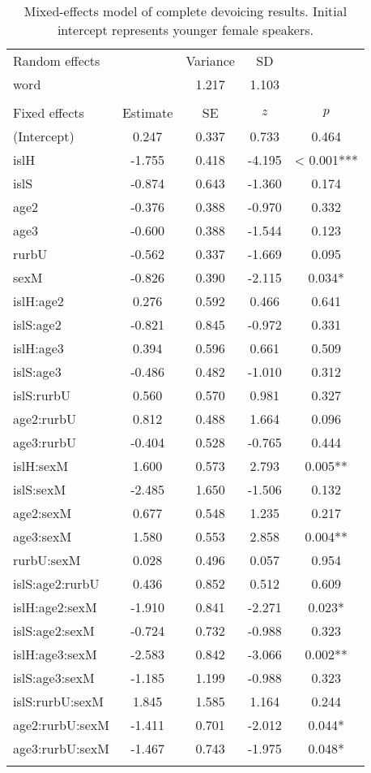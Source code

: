 \documentclass[output=paper,colorlinks,citecolor=brown]{langscibook}
\begin{document}
\begin{table}[hp]
\begin{tabular}{l S[table-format=-1.3] S[table-format=1.3] S[table-format=-1.3] S[table-format=<1.3{***}]}
\lsptoprule
{Random effects} &  & {Variance} & {SD} & \\
word &  & 1.217 & 1.103 & \\
\\
{Fixed effects} & {Estimate} & {SE} & {$z$} & {$p$}\\
\midrule
(Intercept) & 0.247 & 0.337 & 0.733 & 0.464\\
islH & -1.755 & 0.418 & -4.195 & < 0.001{***}\\
islS & -0.874 & 0.643 & -1.360 & 0.174\\
age2 & -0.376 & 0.388 & -0.970 & 0.332\\
age3 & -0.600 & 0.388 & -1.544 & 0.123\\
rurbU & -0.562 & 0.337 & -1.669 & 0.095\\
sexM & -0.826 & 0.390 & -2.115 & 0.034{*}\\
islH:age2 & 0.276 & 0.592 & 0.466 & 0.641\\
islS:age2 & -0.821 & 0.845 & -0.972 & 0.331\\
islH:age3 & 0.394 & 0.596 & 0.661 & 0.509\\
islS:age3 & -0.486 & 0.482 & -1.010 & 0.312\\
islS:rurbU & 0.560 & 0.570 & 0.981 & 0.327\\
age2:rurbU & 0.812 & 0.488 & 1.664 & 0.096\\
age3:rurbU & -0.404 & 0.528 & -0.765 & 0.444\\
islH:sexM & 1.600 & 0.573 & 2.793 & 0.005{**}\\
islS:sexM & -2.485 & 1.650 & -1.506 & 0.132\\
age2:sexM & 0.677 & 0.548 & 1.235 & 0.217\\
age3:sexM & 1.580 & 0.553 & 2.858 & 0.004{**}\\
rurbU:sexM & 0.028 & 0.496 & 0.057 & 0.954\\
islS:age2:rurbU & 0.436 & 0.852 & 0.512 & 0.609\\
islH:age2:sexM & -1.910 & 0.841 & -2.271 & 0.023{*}\\
islS:age2:sexM & -0.724 & 0.732 & -0.988 & 0.323\\
islH:age3:sexM & -2.583 & 0.842 & -3.066 & 0.002{**}\\
islS:age3:sexM & -1.185 & 1.199 & -0.988 & 0.323\\
islS:rurbU:sexM & 1.845 & 1.585 & 1.164 & 0.244\\
age2:rurbU:sexM & -1.411 & 0.701 & -2.012 & 0.044{*}\\
age3:rurbU:sexM & -1.467 & 0.743 & -1.975 & 0.048{*}\\
\lspbottomrule
\end{tabular}
\caption{Mixed-effects model of complete devoicing results. Initial intercept represents younger female  speakers.}
\label{tab:clayton:9}
\end{table}
\end{document}
